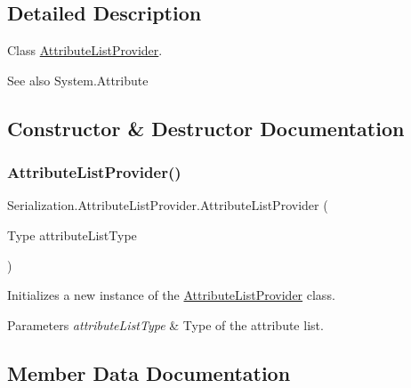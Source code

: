 \subsection{Detailed Description}
Class \hyperlink{class_serialization_1_1_attribute_list_provider}{Attribute\+List\+Provider}. 

\begin{DoxySeeAlso}{See also}
System.\+Attribute


\end{DoxySeeAlso}


\subsection{Constructor \& Destructor Documentation}
\mbox{\label{class_serialization_1_1_attribute_list_provider_a71707014902de0a17f325e2efe18df12}} 
\subsubsection{\texorpdfstring{Attribute\+List\+Provider()}{AttributeListProvider()}}
{\footnotesize\ttfamily Serialization.\+Attribute\+List\+Provider.\+Attribute\+List\+Provider (\begin{DoxyParamCaption}\item[{Type}]{attribute\+List\+Type }\end{DoxyParamCaption})\hspace{0.3cm}{\ttfamily [inline]}}



Initializes a new instance of the \hyperlink{class_serialization_1_1_attribute_list_provider}{Attribute\+List\+Provider} class. 


\begin{DoxyParams}{Parameters}
{\em attribute\+List\+Type} & Type of the attribute list.\\
\hline
\end{DoxyParams}


\subsection{Member Data Documentation}
\mbox{\label{class_serialization_1_1_attribute_list_provider_a785b33c0a2e74addd6d14310fbfb5286}} 
